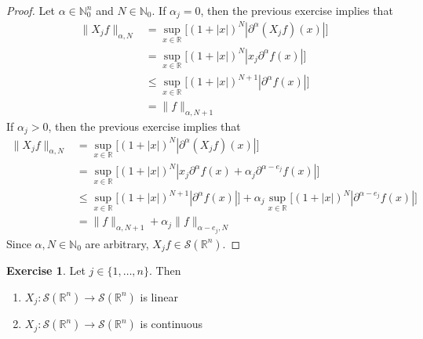 \documentclass[12pt]{amsart}
\theoremstyle{definition}
\newtheorem{ex}[definition]{Exercise}
\newcommand{\p}{\partial}
\newcommand{\al}{\alpha}
\newcommand{\N}{\mathbb{N}}
\newcommand{\R}{\mathbb{R}}
\newcommand{\MS}{\mathcal{S}}
\begin{document}
	\begin{proof}
		Let $\al  \in \N_0^n$ and $N \in \N_0$. If $\al_j = 0$, then the previous exercise implies that  
		\begin{align*}
			\|X_j f\|_{\al, N}
			&= \sup_{x \in \R}\bigg[ (1 + |x|)^N|\p^{\al}(X_jf)(x)| \bigg] \\
			& = \sup_{x \in \R}\bigg[ (1 + |x|)^N|x_j\p^{\al}f(x)| \bigg] \\
			& \leq \sup_{x \in \R}\bigg[ (1 + |x|)^{N+1}|\p^{\al}f(x)| \bigg] \\
			&= \|f\|_{\al, N+1}
		\end{align*}
		If $\al_j > 0$, then the previous exercise implies that  
		\begin{align*}
			\|X_j f\|_{\al, N}
			&= \sup_{x \in \R}\bigg[ (1 + |x|)^N|\p^{\al}(X_jf)(x)| \bigg] \\
			& = \sup_{x \in \R}\bigg[ (1 + |x|)^N|x_j\p^{\al}f(x) + \al_j \p^{\al - e_j} f(x)| \bigg] \\
			& \leq \sup_{x \in \R}\bigg[ (1 + |x|)^{N+1}|\p^{\al}f(x)| \bigg] + \al_j \sup_{x \in \R}\bigg[  (1 + |x|)^N |\p^{\al-e_j} f(x)| \bigg] \\
			&= \|f\|_{\al, N+1} + \al_j \|f\|_{\al-e_j, N}
		\end{align*}
		Since $\al, N \in \N_0$ are arbitrary, $X_jf \in \MS(\R^n)$.
	\end{proof}

	\begin{ex}
		Let $j \in \{1, \ldots, n\}$. Then 
		\begin{enumerate}
			\item $X_j: \MS(\R^n) \rightarrow \MS(\R^n)$ is linear
			\item $X_j: \MS(\R^n) \rightarrow \MS(\R^n)$ is continuous
		\end{enumerate}
	\end{ex}
\end{document}
